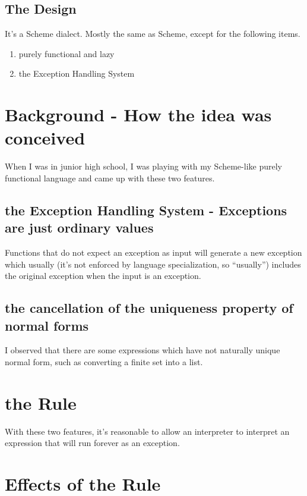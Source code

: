 \documentclass[10pt,preprint,numbers]{sigplanconf}
\begin{document}
\subsection{The Design}

It's a Scheme dialect. Mostly the same as Scheme, except for the following items.

\begin{enumerate}
\item purely functional and lazy
\item the Exception Handling System
\end{enumerate}

\section{Background - How the idea was conceived}

When I was in junior high school, I was playing with my Scheme-like purely functional language and
came up with these two features.

\subsection{the Exception Handling System - Exceptions are just ordinary values}

Functions that do not expect an exception as input will generate a new exception which usually (it's not enforced by language specialization, so ``usually'') includes the original exception when the input is an exception.

\subsection{the cancellation of the uniqueness property of normal forms}

I observed that there are some expressions which have not naturally unique normal form, such as converting a finite set into a list.

\section{the Rule}

With these two features,
it's reasonable to allow an interpreter to interpret an expression that will run forever as an exception.

\section{Effects of the Rule}
\end{document}
